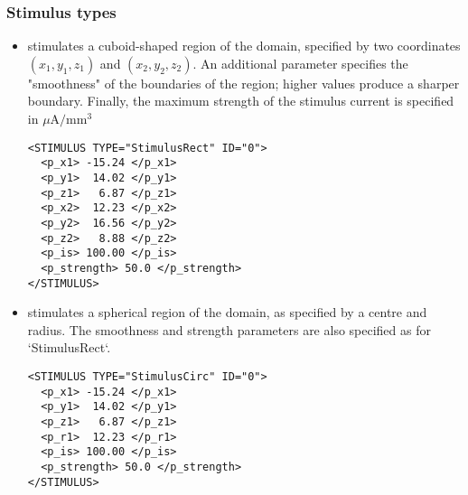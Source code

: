\subsubsection{Stimulus types}
\begin{itemize}
    \item {} stimulates a cuboid-shaped region of the domain,
    specified by two coordinates $(x_1,y_1,z_1)$ and $(x_2,y_2,z_2)$.
    An additional parameter specifies the "smoothness" of the boundaries of the
    region; higher values produce a sharper boundary. Finally, the maximum 
    strength of the stimulus current is specified in $\mu \mathrm{A} / \mathrm{mm}^3$
\begin{lstlisting}[style=XmlStyle]
<STIMULUS TYPE="StimulusRect" ID="0">
  <p_x1> -15.24 </p_x1>
  <p_y1>  14.02 </p_y1>
  <p_z1>   6.87 </p_z1>
  <p_x2>  12.23 </p_x2>
  <p_y2>  16.56 </p_y2>
  <p_z2>   8.88 </p_z2>
  <p_is> 100.00 </p_is>
  <p_strength> 50.0 </p_strength>
</STIMULUS>
\end{lstlisting}

    \item {} stimulates a spherical region of the domain, as
    specified by a centre and radius. The smoothness and strength parameters are also specified as for `StimulusRect`.
\begin{lstlisting}[style=XmlStyle]
<STIMULUS TYPE="StimulusCirc" ID="0">
  <p_x1> -15.24 </p_x1>
  <p_y1>  14.02 </p_y1>
  <p_z1>   6.87 </p_z1>
  <p_r1>  12.23 </p_r1>
  <p_is> 100.00 </p_is>
  <p_strength> 50.0 </p_strength>
</STIMULUS>
\end{lstlisting}
\end{itemize}


